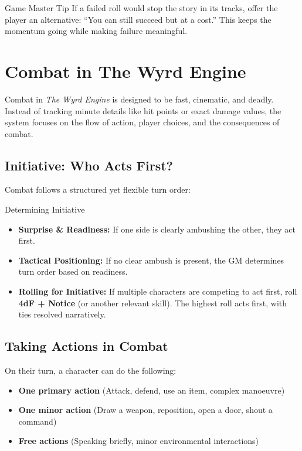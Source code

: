 \begin{DndComment}{Game Master Tip}
    If a failed roll would stop the story in its tracks, offer the player an alternative: “You can still succeed but at a cost.” This keeps the momentum going while making failure meaningful.
\end{DndComment}


\section{Combat in The Wyrd Engine}

Combat in \textit{The Wyrd Engine} is designed to be fast, cinematic, and deadly. Instead of tracking minute details like hit points or exact damage values, the system focuses on the flow of action, player choices, and the consequences of combat.

\subsection{Initiative: Who Acts First?}

Combat follows a structured yet flexible turn order:

\begin{DndReadAloud}{Determining Initiative}
\begin{itemize}
    \item \textbf{Surprise \& Readiness:} If one side is clearly ambushing the other, they act first.
    \item \textbf{Tactical Positioning:} If no clear ambush is present, the GM determines turn order based on readiness.
    \item \textbf{Rolling for Initiative:} If multiple characters are competing to act first, roll \textbf{4dF + Notice} (or another relevant skill). The highest roll acts first, with ties resolved narratively.
\end{itemize}
\end{DndReadAloud}

\subsection{Taking Actions in Combat}

On their turn, a character can do the following:
\begin{itemize}
    \item \textbf{One primary action} (Attack, defend, use an item, complex manoeuvre)
    \item \textbf{One minor action} (Draw a weapon, reposition, open a door, shout a command)
    \item \textbf{Free actions} (Speaking briefly, minor environmental interactions)
\end{itemize}

